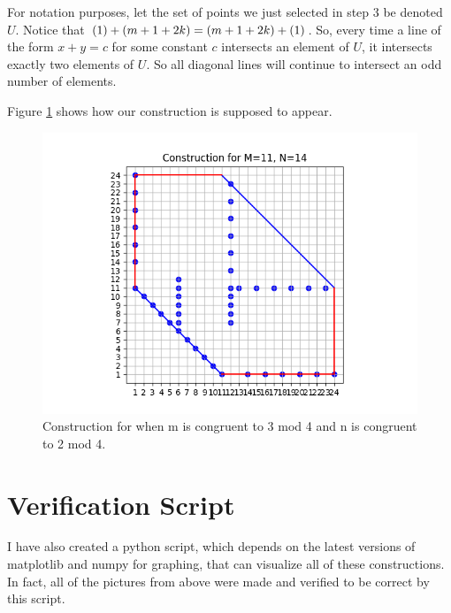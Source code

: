 \documentclass[10pt]{../usamts}
\begin{document}
\begin{solution}
\begin{enumerate}
    For notation purposes, let the set of points we just selected in step 3 be denoted $U$. Notice that $\left( 1 \right)+\left( m+1+2k \right) = \left( m+1+2k \right)+\left( 1 \right)$. So, every time a line of the form $x+y=c$ for some constant $c$ intersects an element of $U$, it intersects exactly two elements of $U$. So all diagonal lines will continue to intersect an odd number of elements.
\end{enumerate}

Figure \ref{fig:twothreeconstruct} shows how our construction is supposed to appear.
\begin{figure}[htbp]
\centering
    \includegraphics[width=12cm]{round2/p5construct/construct_11_14.png}
    \caption{Construction for when m is congruent to 3 mod 4 and n is congruent to 2 mod 4.}
    \label{fig:twothreeconstruct}
\end{figure}

\clearpage
\section*{Verification Script}

I have also created a python script, which depends on the latest versions of matplotlib and numpy for graphing, that can visualize all of these constructions. In fact, all of the pictures from above were made and verified to be correct by this script.

\inputminted{python}{p5construct/algorithm.py}

\end{solution}
\end{document}
